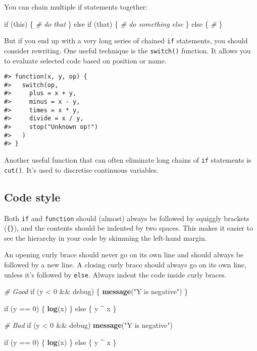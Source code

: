 \documentclass[]{book}
\newenvironment{Shaded}{\begin{snugshade}}{\end{snugshade}}
\newcommand{\KeywordTok}[1]{\textcolor[rgb]{0.13,0.29,0.53}{\textbf{{#1}}}}
\newcommand{\DecValTok}[1]{\textcolor[rgb]{0.00,0.00,0.81}{{#1}}}
\newcommand{\StringTok}[1]{\textcolor[rgb]{0.31,0.60,0.02}{{#1}}}
\newcommand{\CommentTok}[1]{\textcolor[rgb]{0.56,0.35,0.01}{\textit{{#1}}}}
\newcommand{\NormalTok}[1]{{#1}}
\begin{document}
You can chain multiple if statements together:

\begin{Shaded}
\begin{Highlighting}[]
\NormalTok{if (this) \{}
  \CommentTok{# do that}
\NormalTok{\} else if (that) \{}
  \CommentTok{# do something else}
\NormalTok{\} else \{}
  \CommentTok{# }
\NormalTok{\}}
\end{Highlighting}
\end{Shaded}

But if you end up with a very long series of chained \texttt{if}
statements, you should consider rewriting. One useful technique is the
\texttt{switch()} function. It allows you to evaluate selected code
based on position or name.

\begin{verbatim}
#> function(x, y, op) {
#>   switch(op,
#>     plus = x + y,
#>     minus = x - y,
#>     times = x * y,
#>     divide = x / y,
#>     stop("Unknown op!")
#>   )
#> }
\end{verbatim}

Another useful function that can often eliminate long chains of
\texttt{if} statements is \texttt{cut()}. It's used to discretise
continuous variables.

\subsection{Code style}\label{code-style}

Both \texttt{if} and \texttt{function} should (almost) always be
followed by squiggly brackets (\texttt{\{\}}), and the contents should
be indented by two spaces. This makes it easier to see the hierarchy in
your code by skimming the left-hand margin.

An opening curly brace should never go on its own line and should always
be followed by a new line. A closing curly brace should always go on its
own line, unless it's followed by \texttt{else}. Always indent the code
inside curly braces.

\begin{Shaded}
\begin{Highlighting}[]
\CommentTok{# Good}
\NormalTok{if (y <}\StringTok{ }\DecValTok{0} \NormalTok{&&}\StringTok{ }\NormalTok{debug) \{}
  \KeywordTok{message}\NormalTok{(}\StringTok{"Y is negative"}\NormalTok{)}
\NormalTok{\}}

\NormalTok{if (y ==}\StringTok{ }\DecValTok{0}\NormalTok{) \{}
  \KeywordTok{log}\NormalTok{(x)}
\NormalTok{\} else \{}
  \NormalTok{y ^}\StringTok{ }\NormalTok{x}
\NormalTok{\}}

\CommentTok{# Bad}
\NormalTok{if (y <}\StringTok{ }\DecValTok{0} \NormalTok{&&}\StringTok{ }\NormalTok{debug)}
\KeywordTok{message}\NormalTok{(}\StringTok{"Y is negative"}\NormalTok{)}

\NormalTok{if (y ==}\StringTok{ }\DecValTok{0}\NormalTok{) \{}
  \KeywordTok{log}\NormalTok{(x)}
\NormalTok{\} }
\NormalTok{else \{}
  \NormalTok{y ^}\StringTok{ }\NormalTok{x}
\NormalTok{\}}
\end{Highlighting}
\end{Shaded}
\end{document}
